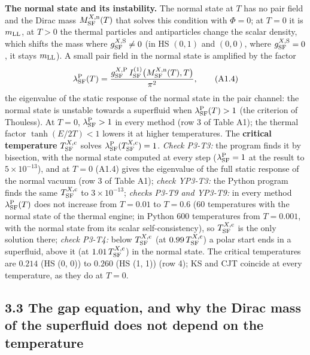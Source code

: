 \documentclass[
  10pt,
]{article}
\begin{document}
\textbf{The normal state and its instability.} The normal state at \(T\)
has no pair field and the Dirac mass \(M^{X,{\rm n}}_{\rm SF}(T)\) that
solves this condition with \(\Phi=0\); at \(T=0\) it is \(m_{\rm LL}\),
at \(T>0\) the thermal particles and antiparticles change the scalar
density, which shifts the mass where \(g^{X,{\rm S}}_{\rm SF}\ne0\) (in
HS \((0,1)\) and \((0,0)\), where \(g^{X,{\rm S}}_{\rm SF}=0\), it stays
\(m_{\rm LL}\)). A small pair field in the normal state is amplified by
the factor
\[\lambda^{\rm P}_{\rm SF}(T)=\frac{g^{X,{\rm P}}_{\rm SF}\,I^{(1)}_{\rm SF}\big(M^{X,{\rm n}}_{\rm SF}(T),T\big)}{\pi^2},\tag{A1.4}\]
the eigenvalue of the static response of the normal state in the pair
channel: the normal state is unstable towards a superfluid when
\(\lambda^{\rm P}_{\rm SF}(T)>1\) (the criterion of Thouless). At
\(T=0\), \(\lambda^{\rm P}_{\rm SF}>1\) in every method (row 3 of Table
A1); the thermal factor \(\tanh(E/2T)<1\) lowers it at higher
temperatures. The \textbf{critical temperature}
\(T^{X,{\rm c}}_{\rm SF}\) solves
\(\lambda^{\rm P}_{\rm SF}(T^{X,{\rm c}}_{\rm SF})=1\). \emph{Check
P3-T3:} the program finds it by bisection, with the normal state
computed at every step (\(\lambda^{\rm P}_{\rm SF}=1\) at the result to
\(5\times10^{-13}\)), and at \(T=0\) (A1.4) gives the eigenvalue of the
full static response of the normal vacuum (row 3 of Table A1);
\emph{check YP3-T3:} the Python program finds the same
\(T^{X,{\rm c}}_{\rm SF}\) to \(3\times10^{-13}\); \emph{checks P3-T9
and YP3-T9:} in every method \(\lambda^{\rm P}_{\rm SF}(T)\) does not
increase from \(T=0.01\) to \(T=0.6\) (60 temperatures with the normal
state of the thermal engine; in Python 600 temperatures from
\(T=0.001\), with the normal state from its scalar self-consistency), so
\(T^{X,{\rm c}}_{\rm SF}\) is the only solution there; \emph{check
P3-T4:} below \(T^{X,{\rm c}}_{\rm SF}\) (at
\(0.99\,T^{X,{\rm c}}_{\rm SF}\)) a polar start ends in a superfluid,
above it (at \(1.01\,T^{X,{\rm c}}_{\rm SF}\)) in the normal state. The
critical temperatures are \(0.214\) (HS (0, 0)) to \(0.260\) (HS (1, 1))
(row 4); KS and CJT coincide at every temperature, as they do at
\(T=0\).

\hypertarget{the-gap-equation-and-why-the-dirac-mass-of-the-superfluid-does-not-depend-on-the-temperature}{%
\subsection{3.3 The gap equation, and why the Dirac mass of the
superfluid does not depend on the
temperature}\label{the-gap-equation-and-why-the-dirac-mass-of-the-superfluid-does-not-depend-on-the-temperature}}
\end{document}

